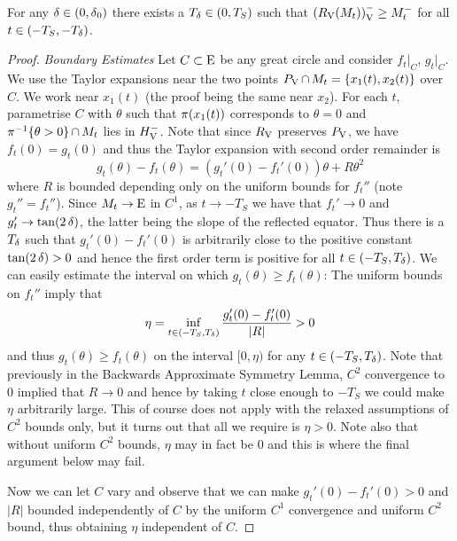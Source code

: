 \documentclass{amsart}
\begin{document}
\begin{lemma}
\label{lem:approximate_symmetry}
For any \(\operatorname{\delta} \in (0,\operatorname{\delta}_0)\) there exists a \(T_{\operatorname{\delta}} \in (0, T_S)\) such that \(({R_{\operatorname{V}}(M_t))}_{\operatorname{V}}^- \geq M_t^-\) for all \(t \in (-T_S, -T_{\operatorname{\delta}})\).
\end{lemma}
\begin{proof}
\emph{Boundary Estimates}
Let \(C\subset \operatorname{E}\) be any great circle and consider \(f_t|_C\), \(g_t|_C\). We use the Taylor expansions near the two points \(P_{\operatorname{V}} \operatorname{\cap} M_t = \{x_1(t), x_2(t)\}\) over \(C\). We work near \(x_1(t)\) (the proof being the same near \(x_2\)). For each \(t\), parametrise \(C\) with \(\theta\) such that \(\operatorname{\pi}(x_1(t))\) corresponds to \(\theta = 0\) and \(\operatorname{\pi}^{-1}\{\theta>0\} \operatorname{\cap} M_t\) lies in \({H}_{{\operatorname{V}}}^-\). Note that since \(R_{\operatorname{V}}\) preserves \(P_{\operatorname{V}}\), we have \(f_t(0) = g_t(0)\) and thus the Taylor expansion with second order remainder is
\[
g_t(\theta) - f_t (\theta) = (g_t'(0) - f_t'(0)) \theta + R \theta^2
\]
where \(R\) is bounded depending only on the uniform bounds for \(f_t''\) (note \(g_t'' = f_t''\)). Since \(M_t \to \operatorname{E}\) in \(C^1\), as \(t\to -T_S\) we have that \(f_t' \to 0\) and \(g_t' \to \tan(2\operatorname{\delta})\), the latter being the slope of the reflected equator. Thus there is a \(T_{\operatorname{\delta}}\) such that \(g_t'(0) - f_t'(0)\) is arbitrarily close to the positive constant \(\tan(2\operatorname{\delta}) > 0\) and hence the first order term is positive for all \(t \in (-T_S, T_{\operatorname{\delta}})\). We can easily estimate the interval on which \(g_t(\theta) \geq f_t (\theta)\): The uniform bounds on \(f_t''\) imply that
\[
\eta = \inf_{t \in (-T_S, T_{\operatorname{\delta}})} \frac{g_t'(0) - f_t'(0)}{|R|} > 0
\]
and thus \(g_t(\theta) \geq f_t (\theta)\) on the interval \([0, \eta)\) for any \(t \in (-T_S, T_{\operatorname{\delta}})\). Note that previously in the Backwards Approximate Symmetry Lemma, \(C^2\) convergence to \(0\) implied that \(R\to 0\) and hence by taking \(t\) close enough to \(-T_S\) we could make \(\eta\) arbitrarily large. This of course does not apply with the relaxed assumptions of \(C^2\) bounds only, but it turns out that all we require is \(\eta > 0\). Note also that without uniform \(C^2\) bounds, \(\eta\) may in fact be \(0\) and this is where the final argument below may fail.

Now we can let \(C\) vary and observe that we can make \(g_t'(0) - f_t'(0) > 0\) and \(|R|\) bounded independently of \(C\) by the uniform \(C^1\) convergence and uniform \(C^2\) bound, thus obtaining \(\eta\) independent of \(C\). 


\end{proof}
\end{document}
